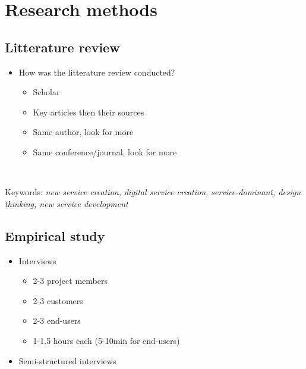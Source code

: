 
\chapter{Research methods}
\label{chapter:mehods}

\section{Litterature review}
\label{section:litterature}

\begin{itemize}
  \item{How was the litterature review conducted?}
  \begin{itemize}
    \item{Scholar}
    \item{Key articles then their sources}
    \item{Same author, look for more}
    \item{Same conference/journal, look for more}
  \end{itemize}
  \
\end{itemize}

Keywords: \textit{new service creation, digital service creation, service-dominant, design thinking, new service development}

\section{Empirical study}
\label{section:empirical}

\begin{itemize}
  \item{Interviews}
  \begin{itemize}
    \item{2-3 project members}
    \item{2-3 customers}
    \item{2-3 end-users}
    \item{1-1.5 hours each (5-10min for end-users)}
  \end{itemize}
  \item{Semi-structured interviews}
\end{itemize}


